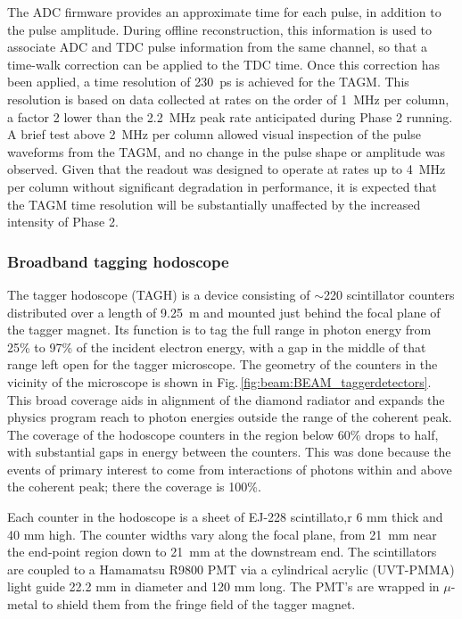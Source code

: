 The ADC firmware provides an approximate time for each pulse, in addition to the
pulse amplitude. During offline reconstruction, this information is used to
associate ADC and TDC pulse information from the same channel, so that a
time-walk correction can be applied to the TDC time. Once this correction
has been applied, a time resolution of 230~ps is achieved for the TAGM.
This resolution is based on data collected at rates on the order of 1~MHz
per column, a factor 2 lower than the 2.2~MHz peak rate anticipated during
\GX{} Phase 2 running. A brief test above 2~MHz per column allowed visual
inspection of the pulse waveforms from the TAGM, and no change in the
pulse shape or amplitude was observed. Given that the readout was designed
to operate at rates up to 4~MHz per column without significant degradation
in performance, it is expected that the TAGM time resolution will be
substantially unaffected by the increased intensity of \GX{} Phase 2.

\subsubsection{Broadband tagging hodoscope}\label{sec:TAGHIntro}
The tagger hodoscope (TAGH) is a device consisting of $\sim$220 scintillator counters distributed over a length of 9.25~m and mounted just behind the focal plane of the tagger magnet.
Its function is to tag the full range in photon energy from 25\% to 97\%
of the incident electron energy, with a gap in the middle of that range
left open for the tagger microscope. The geometry of the counters in the
vicinity of the microscope is shown in Fig.\,\ref{fig:beam:BEAM_taggerdetectors}. 
This broad coverage aids in alignment of the diamond radiator and expands the \GX{} physics program reach to photon energies outside the range of the coherent peak.
The coverage of the hodoscope counters in the region below 60\% drops to half,
with substantial gaps in energy between the counters. This was done because
the events of primary interest to \GX{} come from interactions of photons
within and above the coherent peak; there the coverage is 100\%.

Each counter in the hodoscope is a sheet of EJ-228 scintillato,r 6 mm thick and
40 mm high. The counter widths vary along the focal plane, from 21~mm near the
end-point region down to 21~mm at the downstream end. The scintillators are
coupled to a Hamamatsu R9800 PMT via a cylindrical acrylic (UVT-PMMA) light
guide 22.2 mm in diameter and 120 mm long. The PMT's are wrapped in $\mu$-metal
to shield them from the fringe field of the tagger magnet.

